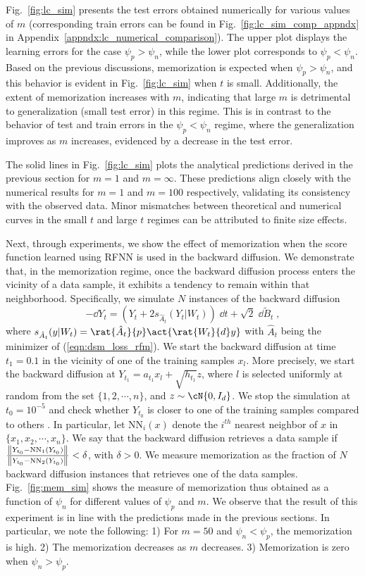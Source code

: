 Fig.~\ref{fig:lc_sim} presents the test errors obtained numerically for various values of $m$ (corresponding train errors can be found in Fig.~\ref{fig:lc_sim_comp_appndx} in Appendix~\ref{appndx:lc_numerical_comparison}). The upper plot displays the learning errors for the case $\psi_p>\psi_n$, while the lower plot corresponds to $\psi_p<\psi_n$. Based on the previous discussions, memorization is expected when $\psi_p>\psi_n$, and this behavior is evident in Fig.~\ref{fig:lc_sim} when $t$ is small. Additionally, the extent of memorization increases with $m$, indicating that large $m$ is detrimental to generalization (small test error) in this regime. This is in contrast to the behavior of test and train errors in the $\psi_p<\psi_n$ regime, where the generalization improves as $m$ increases, evidenced by a decrease in the test error.

The solid lines in Fig.~\ref{fig:lc_sim} plots the analytical predictions derived in the previous section for $m=1$ and $m=\infty$. These predictions align closely with the numerical results for $m=1$ and $m=100$ respectively, validating its consistency with the observed data. Minor mismatches between theoretical and numerical curves in the small $t$ and large $t$ regimes can be attributed to finite size effects.

Next, through experiments, we show the effect of memorization when the score function learned using RFNN is used in the backward diffusion. We demonstrate that, in the memorization regime, once the backward diffusion process enters the vicinity of a data sample, it exhibits a tendency to remain within that neighborhood. Specifically, we simulate $N$ instances of the backward diffusion
\begin{equation*}
    -\dd Y_t = \left(Y_t+2s_{\hat{A}_t}(Y_t|W_t)\right) \;  \dd t+\sqrt{2} \; \dd \tilde{B}_t \;,
\end{equation*}
where $s_{\hat{A}_t}(y|W_t)=\rat{\hat{A}_t}{p}\act{\rat{W_t}{d}y}$ with $\hat{A}_t$ being the minimizer of (\ref{eqn:dsm_loss_rfm}). We start the backward diffusion at time $t_1=0.1$ in the vicinity of one of the training samples $x_l$. More precisely, we start the backward diffusion at $Y_{t_1} = a_{t_1}x_l+\sqrt{h_{t_1}}z$, where $l$ is selected uniformly at random from the set $\{1,2,\cdots,n\}$, and $z\sim\cN{0,I_d}$. We stop the simulation at $t_0=10^{-5}$ and check whether $Y_{t_0}$ is closer to one of the training samples compared to others \cite{yoon_diffusion_2023}. In particular, let $\text{NN}_i(x)$ denote the $i^{th}$ nearest neighbor of $x$ in $\{x_1,x_2,\cdots,x_n\}$. We say that the backward diffusion retrieves a data sample if $\frac{\norm{Y_{t_0}-\text{NN}_1(Y_{t_0})}}{\norm{Y_{t_0}-\text{NN}_2(Y_{t_0})}}<\delta$, with $\delta >0$. We measure memorization as the fraction of $N$ backward diffusion instances that retrieves one of the data samples. Fig.~\ref{fig:mem_sim} shows the measure of memorization thus obtained as a function of $\psi_n$ for different values of $\psi_p$ and $m$. We observe that the result of this experiment is in line with the predictions made in the previous sections. In particular, we note the following: 1) For $m=50$ and $\psi_n<\psi_p$, the memorization is high. 2) The memorization decreases as $m$ decreases. 3) Memorization is zero when $\psi_n>\psi_p$.

